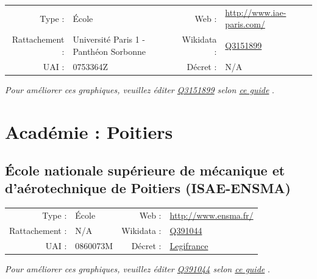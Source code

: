 \documentclass[11pt,french,landscape]{article}
\begin{document}
\begin{tabular*}{0.45\textwidth}{rp{2cm}rl}  
\hline  
Type : & École & Web : &\href{http://www.iae-paris.com/}{http://www.iae-paris.com/} \\  
Rattachement : & Université Paris 1 - Panthéon Sorbonne & Wikidata : & \href{https://www.wikidata.org/entity/Q3151899}{Q3151899} \\  
UAI : & 0753364Z & Décret : & N/A \\  
\hline  
\end{tabular*}

\textit{\scriptsize Pour améliorer ces graphiques, veuillez éditer \href{https://www.wikidata.org/entity/Q3151899}{Q3151899}  selon \href{https://github.com/cpesr/wikidataESR/blob/master/Rmd/wikidataESR.md}{ce guide}}
.


\newpage

\hypertarget{acaduxe9mie-poitiers-1}{%
\section{Académie : Poitiers}\label{acaduxe9mie-poitiers-1}}

\hypertarget{uxe9cole-nationale-supuxe9rieure-de-muxe9canique-et-dauxe9rotechnique-de-poitiers-isae-ensma}{%
\subsection{École nationale supérieure de mécanique et d'aérotechnique
de Poitiers
(ISAE-ENSMA)}\label{uxe9cole-nationale-supuxe9rieure-de-muxe9canique-et-dauxe9rotechnique-de-poitiers-isae-ensma}}

\begin{tabular*}{0.45\textwidth}{rp{2cm}rl}  
\hline  
Type : & École & Web : &\href{http://www.ensma.fr/}{http://www.ensma.fr/} \\  
Rattachement : & N/A & Wikidata : & \href{https://www.wikidata.org/entity/Q391044}{Q391044} \\  
UAI : & 0860073M & Décret : & \href{https://www.legifrance.gouv.fr/affichTexte.do?cidTexte=JORFTEXT000033658895&dateTexte=&categorieLien=id}{Legifrance} \\  
\hline  
\end{tabular*}

\textit{\scriptsize Pour améliorer ces graphiques, veuillez éditer \href{https://www.wikidata.org/entity/Q391044}{Q391044}  selon \href{https://github.com/cpesr/wikidataESR/blob/master/Rmd/wikidataESR.md}{ce guide}}
.
\end{document}
